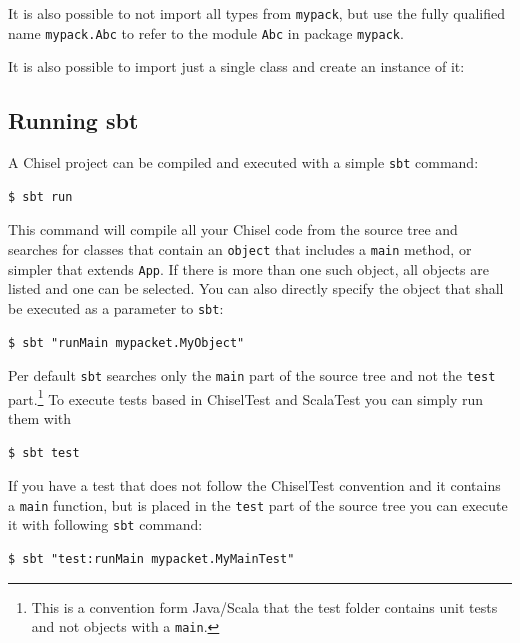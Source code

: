 \documentclass[%
    10pt,
    headinclude, footexclude,
    openright, %
    notitlepage,
    cleardoubleempty,
    headsepline,
    pointlessnumbers,
    bibtotoc, idxtotoc,
    ]{scrbook}
\newcommand{\code}[1]{{\small{\texttt{#1}}}}
\newcommand{\codefoot}[1]{{\footnotesize{\texttt{#1}}}}
\begin{document}

\noindent It is also possible to not import all types from \code{mypack},
but use the fully qualified name \code{mypack.Abc} to refer to the module
\code{Abc} in package \code{mypack}.


\noindent It is also possible to import just a single class and create an instance of it:



\subsection{Running sbt}

A Chisel project can be compiled and executed with a simple \code{sbt} command:

\begin{verbatim}
$ sbt run
\end{verbatim}

This command will compile all your Chisel code from the source tree and searches
for classes that contain an \code{object} that includes a \code{main} method, or simpler
that extends \code{App}. If there is more than one such object, all objects are listed and
one can be selected.
You can also directly specify the object that shall be executed as a parameter to \code{sbt}:

\begin{verbatim}
$ sbt "runMain mypacket.MyObject"
\end{verbatim}

Per default \code{sbt} searches only the \code{main} part of the source tree and not
the \code{test} part.\footnote{This is a convention form Java/Scala that the test folder contains
unit tests and not objects with a \codefoot{main}.}
To execute tests based in ChiselTest and ScalaTest you can simply run them with
\begin{verbatim}
$ sbt test
\end{verbatim}

If you have a test that does not follow the ChiselTest convention and it contains a \code{main}
function, but is placed in the \code{test} part of the source tree you can execute it
with following \code{sbt} command:

\begin{verbatim}
$ sbt "test:runMain mypacket.MyMainTest"
\end{verbatim}
\end{document}
